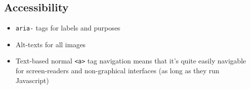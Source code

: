 \documentclass{article}
\begin{document}
\subsection*{Accessibility}
\begin{itemize}
    \item \texttt{aria-} tags for labels and purposes
    \item Alt-texts for all images
    \item Text-based normal \texttt{<a>} tag navigation means that it's quite easily navigable for screen-readers and non-graphical interfaces (as long as they run Javascript)
\end{itemize}
\end{document}
